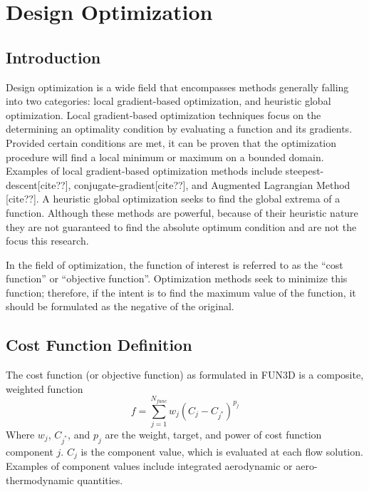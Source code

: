 \chapter{Design Optimization}
\label{chapter-three}

\section{Introduction}

Design optimization is a wide field that encompasses methods generally falling into
two categories: local gradient-based optimization, and heuristic global
optimization.  Local gradient-based optimization techniques focus on the
determining an optimality condition by evaluating a function and its gradients.
Provided certain conditions are met, it can be proven that the optimization
procedure will find a local minimum or maximum on a bounded domain.  Examples of
local gradient-based optimization methods include steepest-descent[cite??],
conjugate-gradient[cite??], and Augmented Lagrangian Method [cite??].  A
heuristic global optimization seeks to find the global extrema of a function.
Although these methods are powerful, because of their heuristic nature they are
not guaranteed to find the absolute optimum condition and are not the focus this
research.

In the field of optimization, the function of interest is referred to as the
``cost function'' or ``objective function''.  Optimization methods seek to
minimize this function; therefore, if the intent is to find the maximum value
of the function, it should be formulated as the negative of the original.

\section{Cost Function Definition}

The cost function (or objective function) as formulated in FUN3D is a composite,
weighted function
%
\begin{equation}
  f = \sum_{j=1}^{N_{func}}w_j\left( C_j - C_{j^*} \right)^{p_j}
  \label{generic_cost_function}
\end{equation}
%
Where $w_j$, $C_{j^*}$, and $p_j$ are the weight, target, and power of cost
function component $j$.  $C_j$ is the component value, which is evaluated at
each flow solution.  Examples of component values include integrated
aerodynamic or aero-thermodynamic quantities.  


